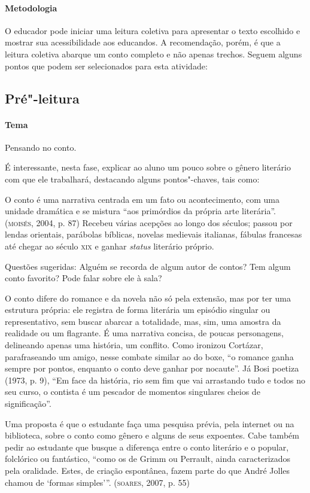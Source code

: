 \documentclass[11pt]{extarticle}
\begin{document}
\paragraph{Metodologia}
O educador pode iniciar uma leitura coletiva para apresentar o texto
escolhido e mostrar sua acessibilidade aos educandos. A recomendação,
porém, é que a leitura coletiva abarque um conto completo e não apenas
trechos. Seguem alguns pontos que podem ser selecionados para esta
atividade:

\subsection{Pré"-leitura}

\paragraph{Tema} Pensando no conto.

É interessante, nesta fase, explicar ao aluno um pouco sobre o gênero
literário com que ele trabalhará, destacando alguns pontos"-chaves, tais
como:

O conto é uma narrativa centrada em um fato ou acontecimento, com uma
unidade dramática e se mistura ``aos primórdios da própria arte
literária''. (\textsc{moisés}, 2004, p. 87) Recebeu várias acepções ao longo dos
séculos; passou por lendas orientais, parábolas bíblicas, novelas
medievais italianas, fábulas francesas até chegar ao século \textsc{xix} e ganhar
\emph{status} literário próprio.

Questões sugeridas: Alguém se recorda de algum autor de contos? Tem
algum conto favorito? Pode falar sobre ele à sala?

O conto difere do romance e da novela não só pela extensão, mas por
ter uma estrutura própria: ele registra de forma literária um episódio
singular ou representativo, sem buscar abarcar a totalidade, mas, sim,
uma amostra da realidade ou um flagrante. É uma narrativa concisa, de
poucas personagens, delineando apenas uma história, um conflito. Como
ironizou Cortázar, parafraseando um amigo, nesse combate similar ao do
boxe, ``o romance ganha sempre por pontos, enquanto o conto deve ganhar
por nocaute''. Já Bosi poetiza (1973, p. 9), ``Em face da história, rio
sem fim que vai arrastando tudo e todos no seu curso, o contista é um
pescador de momentos singulares cheios de significação''.

Uma proposta é que o estudante faça uma pesquisa prévia, pela internet
ou na biblioteca, sobre o conto como gênero e alguns de seus expoentes.
Cabe também pedir ao estudante que busque a diferença entre o conto
literário e o popular, folclórico ou fantástico, ``como os de Grimm ou
Perrault, ainda caracterizados pela oralidade. Estes, de criação
espontânea, fazem parte do que André Jolles chamou de `formas
simples'''. (\textsc{soares}, 2007, p. 55)
\end{document}
